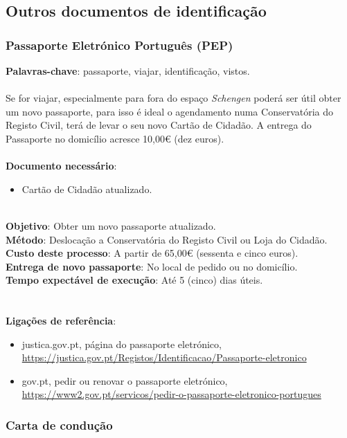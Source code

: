 \subsection{Outros documentos de identificação}

\subsubsection{Passaporte Eletrónico Português (PEP)}

\textbf{Palavras-chave}: passaporte, viajar, identificação, vistos. \\
\\
Se for viajar, especialmente para fora do espaço \emph{Schengen} poderá
ser útil obter um novo passaporte, para isso é ideal o agendamento numa
Conservatória do Registo Civil, terá de levar o seu novo Cartão de
Cidadão. A entrega do Passaporte no domicílio acresce 10,00€ (dez euros). \\
\\
\textbf{Documento necessário}:
\begin{itemize}
	\item Cartão de Cidadão atualizado.
\end{itemize}
\leavevmode\\
\textbf{Objetivo}: Obter um novo passaporte atualizado. \\
\textbf{Método}: Deslocação a Conservatória do Registo Civil ou Loja do Cidadão. \\
\textbf{Custo deste processo}: A partir de 65,00€ (sessenta e cinco euros). \\
\textbf{Entrega de novo passaporte}: No local de pedido ou no domicílio. \\
\textbf{Tempo expectável de execução}: Até 5 (cinco) dias úteis. \\
\\
\newpage
\leavevmode\\
\textbf{Ligações de referência}:
\begin{itemize}
	\item justica.gov.pt, página do passaporte eletrónico, \url{https://justica.gov.pt/Registos/Identificacao/Passaporte-eletronico}
	\item gov.pt, pedir ou renovar o passaporte eletrónico, \url{https://www2.gov.pt/servicos/pedir-o-passaporte-eletronico-portugues}
\end{itemize}

\subsubsection{Carta de condução}

